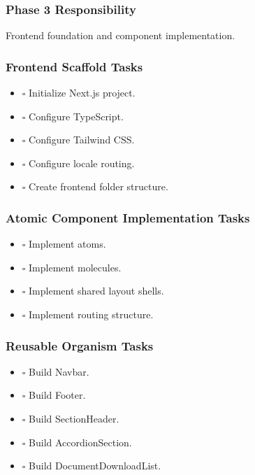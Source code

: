 \documentclass[12pt,a4paper]{article}
\providecommand{\tightlist}{\setlength{\itemsep}{0pt}\setlength{\parskip}{0pt}}
\begin{document}
\subsubsection{Phase 3 Responsibility}\label{phase-3-responsibility-3}

Frontend foundation and component implementation.

\subsubsection{Frontend Scaffold Tasks}\label{frontend-scaffold-tasks}

\begin{itemize}
\tightlist
\item
  \(\square\) Initialize Next.js project.
\item
  \(\square\) Configure TypeScript.
\item
  \(\square\) Configure Tailwind CSS.
\item
  \(\square\) Configure locale routing.
\item
  \(\square\) Create frontend folder structure.
\end{itemize}

\subsubsection{Atomic Component Implementation Tasks}\label{atomic-component-implementation-tasks}

\begin{itemize}
\tightlist
\item
  \(\square\) Implement atoms.
\item
  \(\square\) Implement molecules.
\item
  \(\square\) Implement shared layout shells.
\item
  \(\square\) Implement routing structure.
\end{itemize}

\subsubsection{Reusable Organism Tasks}\label{reusable-organism-tasks}

\begin{itemize}
\tightlist
\item
  \(\square\) Build Navbar.
\item
  \(\square\) Build Footer.
\item
  \(\square\) Build SectionHeader.
\item
  \(\square\) Build AccordionSection.
\item
  \(\square\) Build DocumentDownloadList.
\end{itemize}
\end{document}
